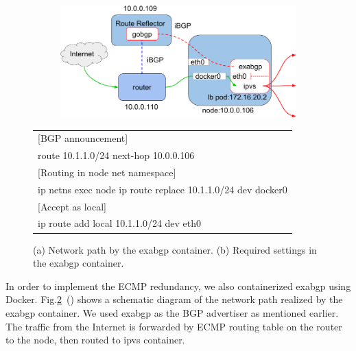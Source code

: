 \begin{figure}[tb]

  \begin{subfigure}[t]{\columnwidth}
    \includegraphics[width=0.9\columnwidth]{Figs/exabgp}
    \caption{}
    \label{fig:exabgp_schem}
  \end{subfigure}

  \par\bigskip

  \begin{subtable}{.9\textwidth}
    \centering
    \begin{tabular}{l}
      \hline 
      \multicolumn{1}{l}{[BGP announcement]} \\
      \hspace{15 mm} route 10.1.1.0/24 next-hop 10.0.0.106 \\
      \multicolumn{1}{l}{[Routing in node net namespace]} \\
      \hspace{15 mm} ip netns exec node ip route replace 10.1.1.0/24 dev docker0 \\
      \multicolumn{1}{l}{[Accept as local]} \\
      \hspace{15 mm} ip route add local 10.1.1.0/24 dev eth0 \\
      \hline
    \end{tabular}
    \caption{}
    \label{fig:exabgp_setting}
  \end{subtable}

  \caption{
    (a) Network path by the exabgp container. (b) Required settings in the exabgp container.
  }
  \label{fig:exabgp}
\end{figure}

In order to implement the ECMP redundancy, we also containerized exabgp using Docker.
Fig.\ref{fig:exabgp}~() shows a schematic diagram of the network path realized by the exabgp container.
We used exabgp as the BGP advertiser as mentioned earlier.
The traffic from the Internet is forwarded by ECMP routing table on the router to the node, then routed to ipvs container.

